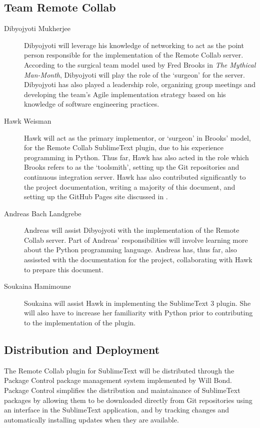 \documentclass[11pt,english]{article}
\begin{document}
	\subsection{Team Remote Collab}
		\begin{description}
			\item[Dibyojyoti Mukherjee]{Dibyojyoti will leverage his knowledge of networking to act as the point person responsible for the implementation of the Remote Collab server. According to the surgical team model used by Fred Brooks in \textit{The Mythical Man-Month}\cite{mythical}, Dibyojyoti will play the role of the `surgeon' for the server. Dibyojyoti has also played a leadership role, organizing group meetings and developing the team's Agile implementation strategy based on his knowledge of software engineering practices.}
			\item[Hawk Weisman]{Hawk will act as the primary implementor, or `surgeon' in Brooks' model\cite{mythical}, for the Remote Collab SublimeText plugin, due to his experience programming in Python. Thus far, Hawk has also acted in the role which Brooks refers to as the `toolsmith'\cite{mythical}, setting up the Git repositories and continuous integration server. Hawk has also contributed significantly to the project documentation, writing a majority of this document, and setting up the GitHub Pages site discussed in .}
			\item[Andreas Bach Landgrebe]{Andreas will assist Dibyojyoti with the implementation of the Remote Collab server. Part of Andreas' responsibilities will involve learning more about the Python programming language. Andreas has, thus far, also assissted with the documentation for the project, collaborating with Hawk to prepare this document.}
			\item[Soukaina Hamimoune]{Soukaina will assist Hawk in implementing the SublimeText 3 plugin. She will also have to increase her familiarity with Python prior to contributing to the implementation of the plugin.}
		\end{description}

	\subsection{Distribution and Deployment}
	\label{sub:dist}
		The Remote Collab plugin for SublimeText will be distributed through the Package Control\cite{packagecontrol} package management system implemented by Will Bond. Package Control simplifies the distribution and maintainance of SublimeText packages by allowing them to be downloaded directly from Git repositories using an interface in the SublimeText application, and by tracking changes and automatically installing updates when they are available.
\end{document}
